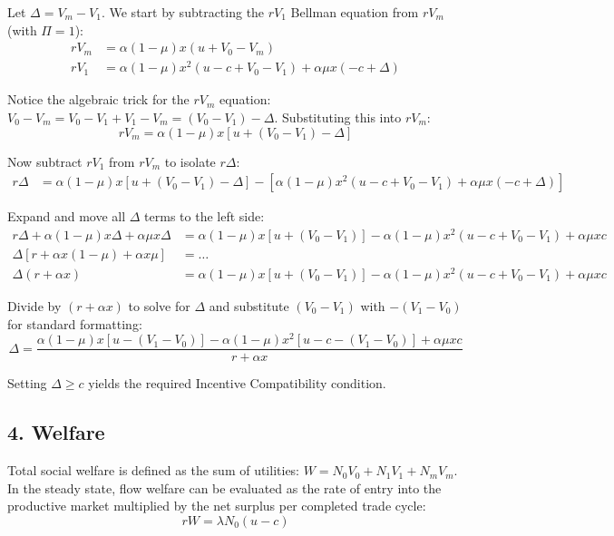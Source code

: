 \documentclass[11pt, a4paper]{article}
\begin{document}
Let $\Delta = V_m - V_1$. We start by subtracting the $rV_1$ Bellman equation from $rV_m$ (with $\Pi=1$):
\begin{align*}
    rV_m &= \alpha(1-\mu)x(u + V_0 - V_m) \\
    rV_1 &= \alpha(1-\mu)x^2(u - c + V_0 - V_1) + \alpha\mu x(-c + \Delta)
\end{align*}

Notice the algebraic trick for the $rV_m$ equation: $V_0 - V_m = V_0 - V_1 + V_1 - V_m = (V_0 - V_1) - \Delta$. Substituting this into $rV_m$:
\begin{equation*}
    rV_m = \alpha(1-\mu)x[u + (V_0 - V_1) - \Delta]
\end{equation*}

Now subtract $rV_1$ from $rV_m$ to isolate $r\Delta$:
\begin{align*}
    r\Delta &= \alpha(1-\mu)x[u + (V_0 - V_1) - \Delta] - \left[ \alpha(1-\mu)x^2(u - c + V_0 - V_1) + \alpha\mu x(-c + \Delta) \right]
\end{align*}

Expand and move all $\Delta$ terms to the left side:
\begin{align*}
    r\Delta + \alpha(1-\mu)x\Delta + \alpha\mu x\Delta &= \alpha(1-\mu)x[u + (V_0 - V_1)] - \alpha(1-\mu)x^2(u - c + V_0 - V_1) + \alpha\mu x c \\
    \Delta [r + \alpha x(1-\mu) + \alpha x\mu] &= \dots \\
    \Delta (r + \alpha x) &= \alpha(1-\mu)x[u + (V_0 - V_1)] - \alpha(1-\mu)x^2(u - c + V_0 - V_1) + \alpha\mu x c
\end{align*}

Divide by $(r + \alpha x)$ to solve for $\Delta$ and substitute $(V_0 - V_1)$ with $-(V_1 - V_0)$ for standard formatting:
\begin{equation}
    \Delta = \frac{\alpha(1-\mu)x[u - (V_1 - V_0)] - \alpha(1-\mu)x^2[u - c - (V_1 - V_0)] + \alpha\mu x c}{r + \alpha x}
\end{equation}

Setting $\Delta \ge c$ yields the required Incentive Compatibility condition.

\subsection*{4. Welfare}
Total social welfare is defined as the sum of utilities: $W = N_0 V_0 + N_1 V_1 + N_m V_m$. In the steady state, flow welfare can be evaluated as the rate of entry into the productive market multiplied by the net surplus per completed trade cycle:
\begin{equation}
    rW = \lambda N_0 (u - c)
\end{equation}
\end{document}
